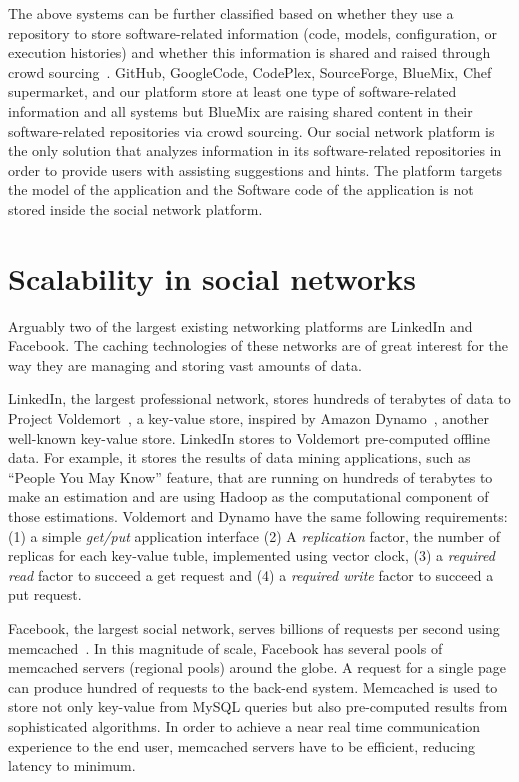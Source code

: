 The above systems can be further classified based on whether they use a repository to store software-related information (code, models, configuration, or execution histories) and whether this information is shared and raised through crowd sourcing~\cite{	howe2006rise}.  GitHub, GoogleCode, CodePlex, SourceForge, BlueMix, Chef supermarket, and our platform store at least one type of software-related information and all systems but BlueMix are raising shared content in their software-related repositories via crowd sourcing. Our social network platform is the only solution that analyzes information in its software-related repositories in order to provide users with assisting suggestions and hints. The platform targets the model of the application and the Software code of the application is not stored inside the social network platform. 

\section{Scalability in social networks}
\label{sec:caching_rel}
Arguably two of the largest existing networking platforms are LinkedIn and Facebook. The caching technologies of these networks are of great interest for the way they are managing and storing vast amounts of data.

LinkedIn, the largest professional network, stores hundreds of terabytes of data to Project Voldemort~\cite{sumbaly2012serving}, a key-value store, inspired by Amazon Dynamo~\cite{decandia2007dynamo}, another well-known key-value store. LinkedIn stores to Voldemort pre-computed offline data. For example, it stores the results of data mining applications, such as ``People You May Know'' feature, that are running on hundreds of terabytes to make an estimation and are using Hadoop as the computational component of those estimations. 
Voldemort and Dynamo have the same following requirements: (1) a simple \emph{get/put} application interface (2) A \emph{replication} factor, the number of replicas for each key-value tuble, implemented using vector clock, (3) a \emph{required read} factor to succeed a get request and (4) a \emph{required write} factor to succeed a put request. 

Facebook, the largest social network, serves billions of requests per second using memcached~\cite{nishtala2013scaling}. In this magnitude of scale, Facebook has several pools of memcached servers (regional pools) around the globe. A request for a single page can produce hundred of requests to the back-end system. Memcached is used to store not only key-value from MySQL queries but also pre-computed results from sophisticated algorithms. 
In order to achieve a near real time communication experience to the end user, memcached servers have to be efficient, reducing latency to minimum. 

